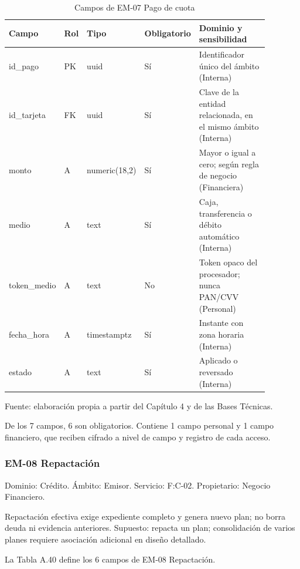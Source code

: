 \documentclass[11pt]{article}
\begin{document}
\begin{table}[htbp]
\caption{Campos de EM-07 Pago de cuota}\label{tab:d_em07}
\centering
\begin{tabular}{@{}p{0.167\linewidth}p{0.070\linewidth}p{0.079\linewidth}p{0.097\linewidth}p{0.465\linewidth}@{}}
\toprule Campo & Rol & Tipo & Obligatorio & Dominio y sensibilidad \\
\midrule
id\_pago & PK & uuid & Sí & Identificador único del ámbito (Interna) \\
id\_tarjeta & FK & uuid & Sí & Clave de la entidad relacionada, en el mismo ámbito (Interna) \\
monto & A & numeric(18,2) & Sí & Mayor o igual a cero; según regla de negocio (Financiera) \\
medio & A & text & Sí & Caja, transferencia o débito automático (Interna) \\
token\_medio & A & text & No & Token opaco del procesador; nunca PAN/CVV (Personal) \\
fecha\_hora & A & timestamptz & Sí & Instante con zona horaria (Interna) \\
estado & A & text & Sí & Aplicado o reversado (Interna) \\
\bottomrule
\end{tabular}
\par\smallskip
{\raggedright Fuente: elaboración propia a partir del Capítulo 4 y de las Bases Técnicas.\par}
\end{table}


De los 7 campos, 6 son obligatorios. Contiene 1 campo personal y 1 campo financiero, que reciben cifrado a nivel de campo y registro de cada acceso.

\subsubsection{EM-08 Repactación}

Dominio: Crédito. Ámbito: Emisor. Servicio: F:C-02. Propietario: Negocio Financiero.

Repactación efectiva exige expediente completo y genera nuevo plan; no borra deuda ni evidencia anteriores. Supuesto: repacta un plan; consolidación de varios planes requiere asociación adicional en diseño detallado.

La Tabla A.40 define los 6 campos de EM-08 Repactación.
\end{document}

